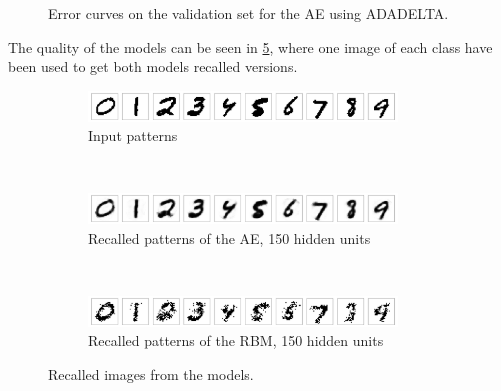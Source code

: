 \documentclass{article}
\begin{document}
\begin{figure}[!ht]
  \centering
  \caption{Error curves on the validation set for the AE using ADADELTA.}
  \label{fig:aetrainingadadelta}
\end{figure}

The quality of the models can be seen in \cref{fig:recall},
where one image of each class have been used to get both models recalled versions.
\begin{figure}[!ht]
  \centering
  \begin{subfigure}[t]{\textwidth}
    \centering
    \includegraphics[width=0.9\textwidth]{../plots/3_1_1/orig_images.png}
    \caption{Input patterns}
    \label{fig:inputpatterns}
  \end{subfigure}
  ~
  \begin{subfigure}[t]{\textwidth}
    \centering
    \includegraphics[width=0.9\textwidth]{../plots/3_1_1/recall_ae_h150.png}
    \caption{Recalled patterns of the AE, 150 hidden units}
    \label{fig:recallae}
  \end{subfigure}
  ~
  \begin{subfigure}[t]{\textwidth}
    \centering
    \includegraphics[width=0.9\textwidth]{../plots/3_1_1/recall_rbm_h150.png}
    \caption{Recalled patterns of the RBM, 150 hidden units}
    \label{fig:recallrbm}
  \end{subfigure}
  \caption{Recalled images from the models.}
  \label{fig:recall}
\end{figure}
\end{document}
